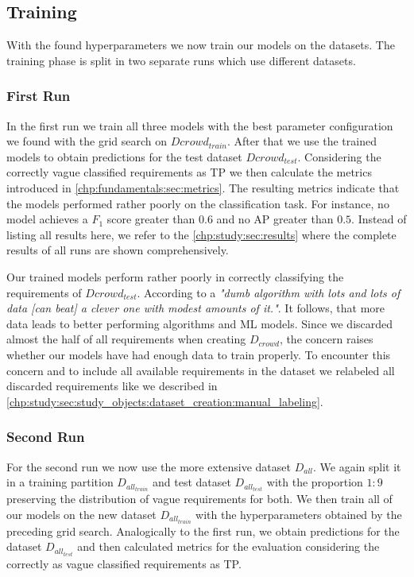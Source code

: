 \subsection{Training}
\label{chp:study:sec:execution:subsec:training}
With the found hyperparameters we now train our models on the datasets.
The training phase is split in two separate runs which use different datasets.

\subsubsection{First Run}
\label{chp:study:sec:execution:subsec:training:first_run}
In the first run we train all three models with the best parameter configuration we found with the grid search on $D{crowd_{train}}$.
After that we use the trained models to obtain predictions for the test dataset $D{crowd_{test}}$.
Considering the correctly vague classified requirements as \ac{TP} we then calculate the metrics introduced in \cref{chp:fundamentals:sec:metrics}.
The resulting metrics indicate that the models performed rather poorly on the classification task.
For instance, no model achieves a $F_1$ score greater than $0.6$ and no \ac{AP} greater than $0.5$. %
Instead of listing all results here, we refer to the \cref{chp:study:sec:results} where the complete results of all runs are shown comprehensively.

Our trained models perform rather poorly in correctly classifying the requirements of $D{crowd_{test}}$.
According to \textcite{Domingos:2012} a \textit{"dumb algorithm with lots and lots of data [can beat] a clever one with modest amounts of it."}.
It follows, that more data leads to better performing algorithms and \ac{ML} models.
Since we discarded almost the half of all requirements when creating $D_{crowd}$, the concern raises whether our models have had enough data to train properly.
To encounter this concern and to include all available requirements in the dataset we relabeled all discarded requirements like we described in \cref{chp:study:sec:study_objects:dataset_creation:manual_labeling}.

\subsubsection{Second Run}
\label{chp:study:sec:execution:subsec:training:second_run}

For the second run we now use the more extensive dataset $D_{all}$.
We again split it in a training partition $D_{all_{train}}$ and test dataset $D_{all_{test}}$ with the proportion $1\mathrm{:}9$ preserving the distribution of vague requirements for both.
We then train all of our models on the new dataset $D_{all_{train}}$ with the hyperparameters obtained by the preceding grid search.
Analogically to the first run, we obtain predictions for the dataset $D_{all_{test}}$ and then calculated metrics for the evaluation considering the correctly as vague classified requirements as \ac{TP}.
